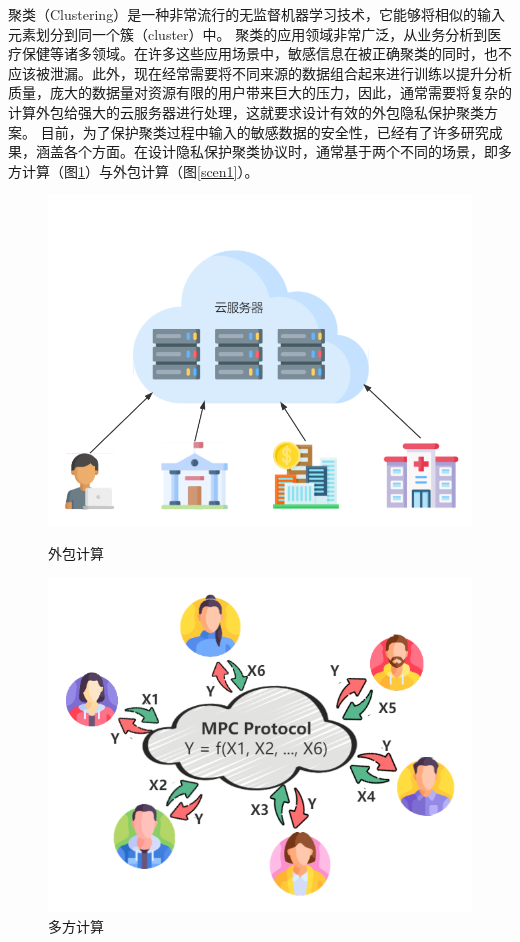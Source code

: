 聚类（Clustering）是一种非常流行的无监督机器学习技术，它能够将相似的输入元素划分到同一个簇（cluster）中。
聚类的应用领域非常广泛，从业务分析到医疗保健等诸多领域。在许多这些应用场景中，敏感信息在被正确聚类的同时，也不应该被泄漏。此外，现在经常需要将不同来源的数据组合起来进行训练以提升分析质量，庞大的数据量对资源有限的用户带来巨大的压力，因此，通常需要将复杂的计算外包给强大的云服务器进行处理，这就要求设计有效的外包隐私保护聚类方案\cite{ahmed2020k}。
目前，为了保护聚类过程中输入的敏感数据的安全性，已经有了许多研究成果，涵盖各个方面。在设计隐私保护聚类协议时，通常基于两个不同的场景，即多方计算（图\ref{scen2}）与外包计算（图\ref{scen1}）。
\begin{figure}[htbp] %
	\begin{minipage}[t]{0.45\linewidth}
		\includegraphics[width=\linewidth]{img/outsource.png}
		\caption{外包计算}
		\label{scen1}
	\end{minipage}%
	\hfill%
	\begin{minipage}[t]{0.45\linewidth}
		\includegraphics[width=\linewidth]{img/mpc.png}
		\caption{多方计算}
		\label{scen2}
	\end{minipage}
\end{figure}

